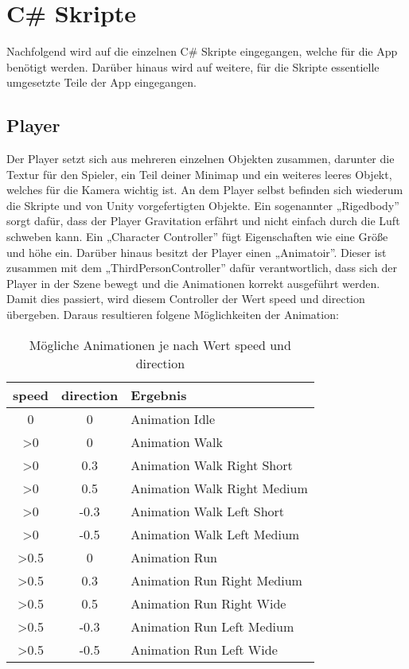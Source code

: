 \section{C\# Skripte}
	Nachfolgend wird auf die einzelnen C\# Skripte eingegangen, welche für die App benötigt werden. Darüber hinaus wird auf weitere, für die Skripte essentielle umgesetzte Teile der App eingegangen.

\subsection{Player}
	Der Player setzt sich aus mehreren einzelnen Objekten zusammen, darunter die Textur für den Spieler, ein Teil deiner Minimap und ein weiteres leeres Objekt, welches für die Kamera wichtig ist. An dem Player selbst befinden sich wiederum die Skripte und von Unity vorgefertigten Objekte. Ein sogenannter „Rigedbody” sorgt dafür, dass der Player Gravitation erfährt und nicht einfach durch die Luft schweben kann. Ein „Character Controller” fügt Eigenschaften wie eine Größe und höhe ein. Darüber hinaus besitzt der Player einen „Animatoir”. Dieser ist zusammen mit dem „ThirdPersonController” dafür verantwortlich, dass sich der Player in der Szene bewegt und die Animationen korrekt ausgeführt werden. Damit dies passiert, wird diesem Controller der Wert speed und direction übergeben. Daraus resultieren folgene Möglichkeiten der Animation:

 \begin{table}[htbp]
 \begin{tabular}{|c|c|l|}
 \hline
  speed & direction & Ergebnis \\
 \hline
  0 & 0 & Animation Idle \\
  >0 & 0 & Animation Walk \\
  >0 & 0.3 & Animation Walk Right Short \\
  >0 & 0.5 & Animation Walk Right Medium \\
  >0 & -0.3 & Animation Walk Left Short \\
  >0 & -0.5 & Animation Walk Left Medium \\
  >0.5 & 0 & Animation Run \\
  >0.5 & 0.3 & Animation Run Right Medium \\
  >0.5 & 0.5 & Animation Run Right Wide \\
  >0.5 & -0.3 & Animation Run Left Medium \\
  >0.5 & -0.5 & Animation Run Left Wide \\ \hline
 \end{tabular}
  \caption{Mögliche Animationen je nach Wert speed und direction}
 \label{tab:tabspeeddirection}
 \end{table}
 
